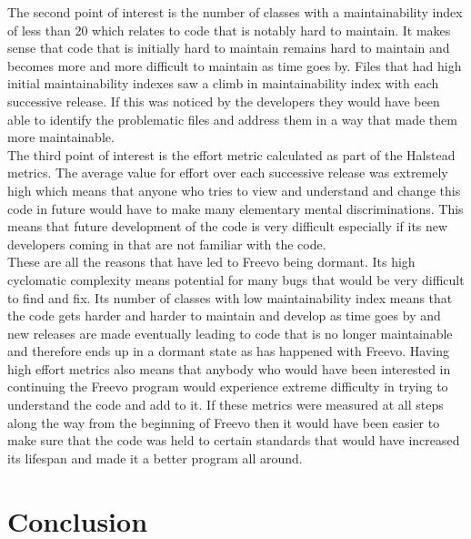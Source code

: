 \documentclass[10.5pt,journal, a4paper]{IEEEtran}
\begin{document}
\noindent 
The second point of interest is the number of classes with a maintainability index of less than 20 which relates to code that is notably hard to maintain. It makes sense that code that is initially hard to maintain remains hard to maintain and becomes more and more difficult to maintain as time goes by. Files that had high initial maintainability indexes saw a climb in maintainability index with each successive release. If this was noticed by the developers they would have been able to identify the problematic files and address them in a way that made them more maintainable.\\

\noindent
The third point of interest is the effort metric calculated as part of the Halstead metrics. The average value for effort over each successive release was extremely high which means that anyone who tries to view and understand and change this code in future would have to make many elementary mental discriminations. This means that future development of the code is very difficult especially if its new developers coming in that are not familiar with the code. \\

\noindent
These are all the reasons that have led to Freevo being dormant. Its high cyclomatic complexity means potential for many bugs that would be very difficult to find and fix. Its number of classes with low maintainability index means that the code gets harder and harder to maintain and develop as time goes by and new releases are made eventually leading to code that is no longer maintainable and therefore ends up in a dormant state as has happened with Freevo. Having high effort metrics also means that anybody who would have been interested in continuing the Freevo program would experience extreme difficulty in trying to understand the code and add to it. If these metrics were measured at all steps along the way from the beginning of Freevo then it would have been easier to make sure that the code was held to certain standards that would have increased its lifespan and made it a better program all around.  



\section{Conclusion}

\end{document}
